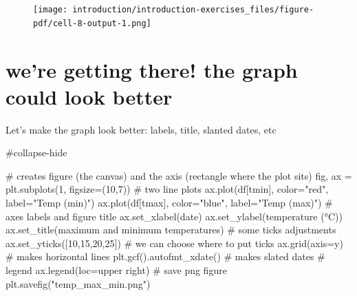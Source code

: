 \documentclass[
  letterpaper,
  DIV=11,
  numbers=noendperiod]{scrreprt}
\newenvironment{Shaded}{\begin{snugshade}}{\end{snugshade}}
\newcommand{\CommentTok}[1]{\textcolor[rgb]{0.37,0.37,0.37}{#1}}
\newcommand{\DecValTok}[1]{\textcolor[rgb]{0.68,0.00,0.00}{#1}}
\newcommand{\NormalTok}[1]{\textcolor[rgb]{0.00,0.23,0.31}{#1}}
\newcommand{\OperatorTok}[1]{\textcolor[rgb]{0.37,0.37,0.37}{#1}}
\newcommand{\StringTok}[1]{\textcolor[rgb]{0.13,0.47,0.30}{#1}}
\begin{document}
\begin{figure}[H]

{\centering \texttt{[image: introduction/introduction-exercises\_files/figure-pdf/cell-8-output-1.png]}

}

\end{figure}

\hypertarget{were-getting-there-the-graph-could-look-better}{%
\section{we're getting there! the graph could look
better}\label{were-getting-there-the-graph-could-look-better}}

Let's make the graph look better: labels, title, slanted dates, etc

\begin{Shaded}
\begin{Highlighting}[]
\CommentTok{\#collapse{-}hide}

\CommentTok{\# creates figure (the canvas) and the axis (rectangle where the plot sits)}
\NormalTok{fig, ax }\OperatorTok{=}\NormalTok{ plt.subplots(}\DecValTok{1}\NormalTok{, figsize}\OperatorTok{=}\NormalTok{(}\DecValTok{10}\NormalTok{,}\DecValTok{7}\NormalTok{))}
\CommentTok{\# two line plots}
\NormalTok{ax.plot(df[}\StringTok{\textquotesingle{}tmin\textquotesingle{}}\NormalTok{], color}\OperatorTok{=}\StringTok{"red"}\NormalTok{, label}\OperatorTok{=}\StringTok{"Temp (min)"}\NormalTok{)}
\NormalTok{ax.plot(df[}\StringTok{\textquotesingle{}tmax\textquotesingle{}}\NormalTok{], color}\OperatorTok{=}\StringTok{"blue"}\NormalTok{, label}\OperatorTok{=}\StringTok{"Temp (max)"}\NormalTok{)}
\CommentTok{\# axes labels and figure title}
\NormalTok{ax.set\_xlabel(}\StringTok{\textquotesingle{}date\textquotesingle{}}\NormalTok{)}
\NormalTok{ax.set\_ylabel(}\StringTok{\textquotesingle{}temperature (°C)\textquotesingle{}}\NormalTok{)}
\NormalTok{ax.set\_title(}\StringTok{\textquotesingle{}maximum and minimum temperatures\textquotesingle{}}\NormalTok{)}
\CommentTok{\# some ticks adjustments}
\NormalTok{ax.set\_yticks([}\DecValTok{10}\NormalTok{,}\DecValTok{15}\NormalTok{,}\DecValTok{20}\NormalTok{,}\DecValTok{25}\NormalTok{])  }\CommentTok{\# we can choose where to put ticks}
\NormalTok{ax.grid(axis}\OperatorTok{=}\StringTok{\textquotesingle{}y\textquotesingle{}}\NormalTok{)         }\CommentTok{\# makes horizontal lines}
\NormalTok{plt.gcf().autofmt\_xdate()  }\CommentTok{\# makes slated dates}
\CommentTok{\# legend}
\NormalTok{ax.legend(loc}\OperatorTok{=}\StringTok{\textquotesingle{}upper right\textquotesingle{}}\NormalTok{)}
\CommentTok{\# save png figure}
\NormalTok{plt.savefig(}\StringTok{"temp\_max\_min.png"}\NormalTok{)}
\end{Highlighting}
\end{Shaded}
\end{document}
